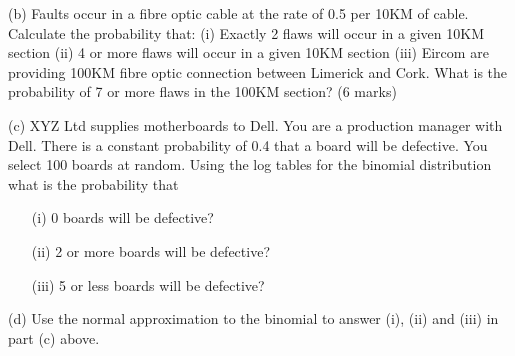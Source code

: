 \documentclass[]{report}
\begin{document}
(b)	Faults occur in a fibre optic cable at the rate of 0.5 per 10KM of cable.  Calculate the probability that:
(i) Exactly 2 flaws will occur in a given 10KM section
(ii) 4 or more flaws will occur in a given 10KM section
(iii)	Eircom are providing 100KM fibre optic connection between Limerick and Cork.  What is the probability of 7 or more flaws in the 100KM section?					
(6 marks)


(c)	XYZ Ltd supplies motherboards to Dell.  You are a production manager with Dell.  There is a constant probability of 0.4 that a board will be defective.  You select 100 boards at random.  Using the log tables for the binomial distribution what is the probability that

\begin{itemize}
	\item[(i)] 0 boards will be defective?
	\item[(ii)] 2 or more boards will be defective?
	\item[(iii)]	5 or less boards will be defective?
\end{itemize}
(d)	Use the normal approximation to the binomial to answer (i), (ii) and (iii) in part (c) above.
%
%
%
%
%
%
%
%
\end{document}
